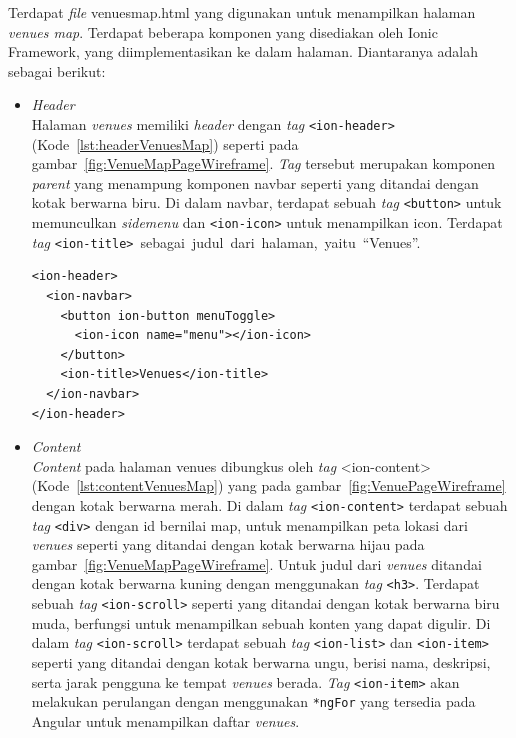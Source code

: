 \begin{enumerate}
\begin{enumerate}
	Terdapat \textit{file} venues\textunderscore map.html yang digunakan untuk menampilkan halaman \textit{venues map}. Terdapat beberapa komponen yang disediakan oleh Ionic Framework, yang diimplementasikan ke dalam halaman. Diantaranya adalah sebagai berikut:
\newpage
	\begin{itemize}
		\item \textit{Header} \\
		 Halaman \textit{venues} memiliki \textit{header} dengan \textit{tag} \texttt{<ion-header>} (Kode~\ref{lst:headerVenuesMap}) seperti pada gambar~\ref{fig:VenueMapPageWireframe}. \textit{Tag} tersebut merupakan komponen \textit{parent} yang menampung komponen navbar seperti yang ditandai dengan kotak berwarna biru. Di dalam navbar, terdapat sebuah \textit{tag} \texttt{<button>} untuk memunculkan \textit{sidemenu} dan \texttt{<ion-icon>} untuk menampilkan icon. Terdapat \textit{tag} \texttt{<ion-title>}~sebagai~judul~dari~halaman,~yaitu~``Venues''.
		
\begin{lstlisting}[label={lst:headerVenuesMap}, caption=\textit{Header} pada venues\textunderscore map.html]
<ion-header>
  <ion-navbar>
    <button ion-button menuToggle>
      <ion-icon name="menu"></ion-icon>
    </button>
    <ion-title>Venues</ion-title>
  </ion-navbar>
</ion-header>
\end{lstlisting}

		\item \textit{Content} \\
		\textit{Content} pada halaman venues dibungkus oleh \textit{tag} <ion-content> (Kode~\ref{lst:contentVenuesMap}) yang pada gambar~\ref{fig:VenuePageWireframe} dengan kotak berwarna merah. Di dalam \textit{tag} \texttt{<ion-content>} terdapat sebuah \textit{tag} \texttt{<div>} dengan id bernilai map, untuk menampilkan peta lokasi dari \textit{venues} seperti yang ditandai dengan kotak berwarna hijau pada gambar~\ref{fig:VenueMapPageWireframe}. Untuk judul dari \textit{venues} ditandai dengan kotak berwarna kuning dengan menggunakan \textit{tag} \texttt{<h3>}. Terdapat sebuah \textit{tag} \texttt{<ion-scroll>} seperti yang ditandai dengan kotak berwarna biru muda, berfungsi untuk menampilkan sebuah konten yang dapat digulir. Di dalam \textit{tag} \texttt{<ion-scroll>} terdapat sebuah \textit{tag} \texttt{<ion-list>} dan \texttt{<ion-item>} seperti yang ditandai dengan kotak berwarna ungu, berisi nama, deskripsi, serta jarak pengguna ke tempat \textit{venues} berada. \textit{Tag} \texttt{<ion-item>} akan melakukan perulangan dengan menggunakan \texttt{*ngFor} yang tersedia pada Angular untuk menampilkan daftar \textit{venues}.
		

\end{itemize}
\end{enumerate}
\end{enumerate}
